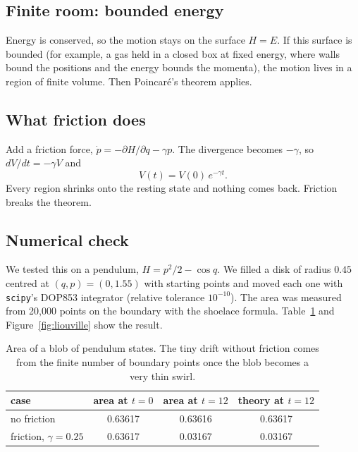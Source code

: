 \documentclass[11pt,a4paper]{article}
\theoremstyle{definition}
\begin{document}
\subsection{Finite room: bounded energy}

Energy is conserved, so the motion stays on the surface $H = E$. If this surface is bounded (for example, a gas held in a closed box at fixed energy, where walls bound the positions and the energy bounds the momenta), the motion lives in a region of finite volume. Then Poincar\'e's theorem applies.

\subsection{What friction does}

Add a friction force, $\dot p = -\partial H/\partial q - \gamma p$. The divergence becomes $-\gamma$, so $dV/dt = -\gamma V$ and
\[
V(t) = V(0)\, e^{-\gamma t}.
\]
Every region shrinks onto the resting state and nothing comes back. Friction breaks the theorem.

\subsection{Numerical check}

We tested this on a pendulum, $H = p^2/2 - \cos q$. We filled a disk of radius $0.45$ centred at $(q,p) = (0, 1.55)$ with starting points and moved each one with \texttt{scipy}'s DOP853 integrator \cite{hairer} (relative tolerance $10^{-10}$). The area was measured from 20{,}000 points on the boundary with the shoelace formula. Table~\ref{tab:liouville} and Figure~\ref{fig:liouville} show the result.

\begin{table}[H]
  \centering
  \begin{tabular}{lccc}
    \toprule
    case & area at $t=0$ & area at $t=12$ & theory at $t=12$ \\
    \midrule
    no friction & 0.63617 & 0.63616 & 0.63617 \\
    friction, $\gamma = 0.25$ & 0.63617 & 0.03167 & 0.03167 \\
    \bottomrule
  \end{tabular}
  \caption{Area of a blob of pendulum states. The tiny drift without friction comes from the finite number of boundary points once the blob becomes a very thin swirl.}
  \label{tab:liouville}
\end{table}
\end{document}
